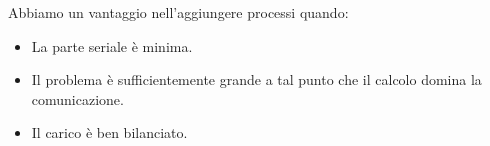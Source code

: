 Abbiamo un vantaggio nell'aggiungere processi quando:
\begin{itemize}
    \item La parte seriale è minima.
    \item Il problema è sufficientemente grande a tal punto che il calcolo domina la comunicazione.
    \item Il carico è ben bilanciato.
\end{itemize}